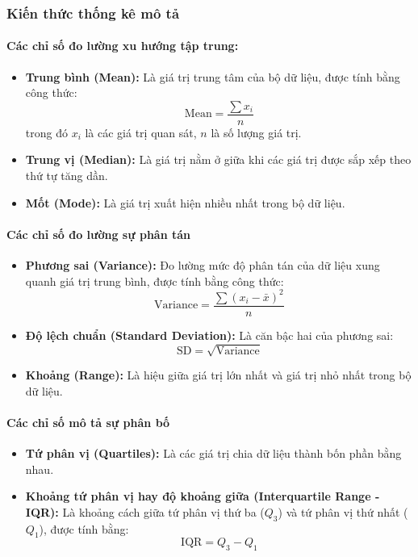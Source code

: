\subsubsection{ Kiến thức thống kê mô tả}

\paragraph{Các chỉ số đo lường xu hướng tập trung:}
\begin{itemize}
    \item \textbf{Trung bình (Mean):} Là giá trị trung tâm của bộ dữ liệu, được tính bằng công thức:
    \[
    \text{Mean} = \frac{\sum x_i}{n}
    \]
    trong đó $x_i$ là các giá trị quan sát, $n$ là số lượng giá trị.
    \item \textbf{Trung vị (Median):} Là giá trị nằm ở giữa khi các giá trị được sắp xếp theo thứ tự tăng dần.
    \item \textbf{Mốt (Mode):} Là giá trị xuất hiện nhiều nhất trong bộ dữ liệu.
\end{itemize}

\paragraph{Các chỉ số đo lường sự phân tán}
\begin{itemize}
    \item \textbf{Phương sai (Variance):} Đo lường mức độ phân tán của dữ liệu xung quanh giá trị trung bình, được tính bằng công thức:
    \[
    \text{Variance} = \frac{\sum (x_i - \bar{x})^2}{n}
    \]
    \item \textbf{Độ lệch chuẩn (Standard Deviation):} Là căn bậc hai của phương sai:
    \[
    \text{SD} = \sqrt{\text{Variance}}
    \]
    \item \textbf{Khoảng (Range):} Là hiệu giữa giá trị lớn nhất và giá trị nhỏ nhất trong bộ dữ liệu.
\end{itemize}

\paragraph{Các chỉ số mô tả sự phân bố}
\begin{itemize}
    \item \textbf{Tứ phân vị (Quartiles):} Là các giá trị chia dữ liệu thành bốn phần bằng nhau.
    \item \textbf{Khoảng tứ phân vị hay độ khoảng giữa (Interquartile Range - IQR):} Là khoảng cách giữa tứ phân vị thứ ba ($Q_3$) và tứ phân vị thứ nhất ($Q_1$), được tính bằng:
    \[
    \text{IQR} = Q_3 - Q_1
    \]
\end{itemize}

